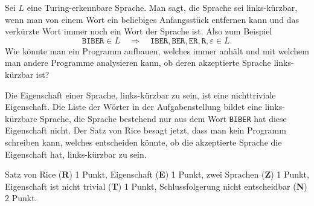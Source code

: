 Sei $L$ eine Turing-erkennbare Sprache.
Man sagt, die Sprache sei links-kürzbar, wenn man von einem Wort ein beliebiges
Anfangsstück entfernen kann und das verkürzte Wort immer noch ein Wort
der Sprache ist.
Also zum Beispiel
\[
\texttt{BIBER}\in L
\quad\Rightarrow\quad
\texttt{IBER},
\texttt{BER},
\texttt{ER},
\texttt{R},
\varepsilon \in L.
\]
Wie könnte man ein Programm aufbauen, welches immer anhält und mit
welchem man andere Programme analysieren kann, ob deren akzeptierte Sprache
links-kürzbar ist?

\begin{loesung}
Die Eigenschaft einer Sprache, links-kürzbar zu sein, ist eine nichttriviale 
Eigenschaft.
Die Liste der Wörter in der Aufgabenstellung bildet eine links-kürzbare
Sprache, die Sprache bestehend nur aus dem Wort \texttt{BIBER} hat diese
Eigenschaft nicht.
Der Satz von Rice besagt jetzt, dass man kein Programm schreiben kann, welches
entscheiden könnte, ob die akzeptierte Sprache die Eigenschaft hat,
links-kürzbar zu sein.
\end{loesung}

\begin{bewertung}
Satz von Rice ({\bf R}) 1 Punkt,
Eigenschaft ({\bf E}) 1 Punkt,
zwei Sprachen ({\bf Z}) 1 Punkt,
Eigenschaft ist nicht trivial ({\bf T}) 1 Punkt,
Schlussfolgerung nicht entscheidbar ({\bf N}) 2 Punkt.
\end{bewertung}




